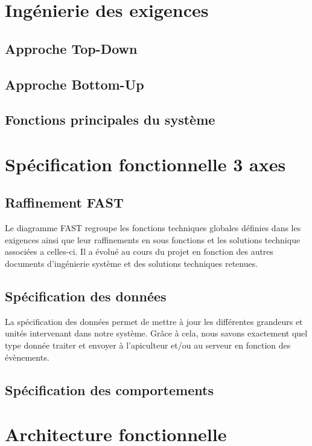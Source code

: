 \chapter{Ingénierie des exigences}
\section{Approche Top-Down}
\label{sec:top-down}

\section{Approche Bottom-Up}

\section{Fonctions principales du système}

\chapter{Spécification fonctionnelle  3 axes}

\section{Raffinement FAST}
Le diagramme FAST regroupe les fonctions techniques globales définies dans les 
exigences ainsi que leur raffinements en sous fonctions et les solutions technique 
associées a celles-ci. Il a évolué au cours du projet en fonction des autres documents 
d'ingénierie système et des solutions techniques retenues. 

\section{Spécification des données}
La spécification des données permet de mettre à jour les différentes grandeurs 
et unités intervenant dans notre système. Grâce à cela, nous savons exactement 
quel type donnée traiter et envoyer à l'apiculteur et/ou au serveur en fonction des évènements.

\section{Spécification des comportements}


\chapter{Architecture fonctionnelle}


